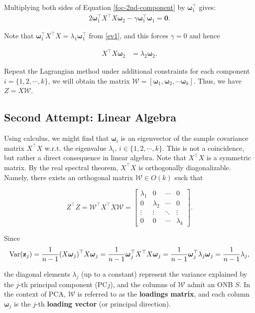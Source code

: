 \documentclass[12pt]{article}
\begin{document}
Multiplying both sides of Equation \eqref{foc-2nd-component} by $\boldsymbol{\omega}_1^\top$ gives:
\begin{align}
2\boldsymbol{\omega}_1^\top X^\top X \boldsymbol{\omega}_2 - \gamma \boldsymbol{\omega}_1^\top\boldsymbol{\omega}_1 = \mathbf{0}.
\end{align}

Note that $\boldsymbol{\omega}_1^\top X^\top X = \lambda_1 \boldsymbol{\omega}_1^\top$ from \eqref{ev1}, and this forces $\gamma=0$ and hence

\begin{align}
X^\top X \boldsymbol{\omega}_2 &= \lambda_2 \boldsymbol{\omega}_2.
\label{ev2}
\end{align}

Repeat the Lagrangian method under additional constraints for each component $i=\{1,2,\cdots,k\}$, we will obtain the matrix $\mathcal{W} = [\boldsymbol{\omega}_1, \boldsymbol{\omega}_2, \cdots \boldsymbol{\omega}_k]$.
Thus, we have $Z = X\mathcal{W}$.

\subsection{Second Attempt: Linear Algebra}

Using calculus, we might find that $\boldsymbol{\omega}_i$ is an eigenvector of the sample covariance matrix $X^\top X$ w.r.t. the eigenvalue $\lambda_i,\,i\in\{1,2,\cdots,k\}.$
This is not a coincidence, but rather a direct consequence in linear algebra.
Note that $X^\top X$ is a symmetric matrix. By the real spectral theorem, $X^\top X$ is orthogonally diagonalizable. 
Namely, there exists an orthogonal matrix $\mathcal{W}\in O(k)$ such that

\[
Z^\top Z = \mathcal{W}^\top X^\top X \mathcal{W} = \begin{bmatrix}
\lambda_1 & 0 & \cdots & 0 \\
0 & \lambda_2 & \cdots & 0 \\
\vdots & \vdots & \ddots & \vdots \\
0 & 0 & \cdots & \lambda_k
\end{bmatrix}.
\]

Since
\[\operatorname{Var}(\mathbf{z}_j) = \frac{1}{n-1} (X \boldsymbol{\omega}_j)^\top X \boldsymbol{\omega}_j = \frac{1}{n-1}\boldsymbol{\omega}_j^\top X^\top X \boldsymbol{\omega}_j = \frac{1}{n-1}\boldsymbol{\omega}_j^\top \lambda_j \boldsymbol{\omega}_j = \frac{1}{n-1}\lambda_j,\]

the diagonal elements $\lambda_j$ (up to a constant) represent the variance explained by the $j$-th principal component (PC$j$), and the columns of $\mathcal{W}$ admit an ONB $S$. In the context of PCA, $\mathcal{W}$ is referred to as the \textbf{loadings matrix}, and each column $\boldsymbol{\omega}_j$ is the $j$-th \textbf{loading vector} (or principal direction).
\end{document}
